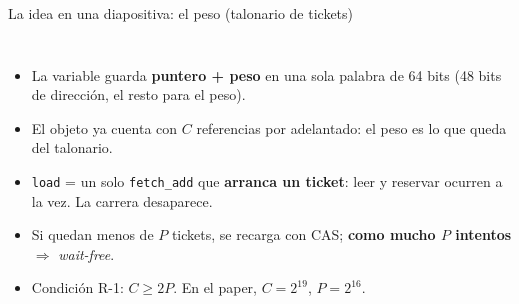 \documentclass[aspectratio=169,11pt]{beamer}
\newcommand{\clave}[1]{\textcolor{acento}{\textbf{#1}}}
\begin{document}
\begin{frame}{La idea en una diapositiva: el peso (talonario de tickets)}
  \begin{columns}[c]
    \begin{itemize}\small
      \item La variable guarda \textbf{puntero + peso} en una sola palabra de 64 bits (48 bits de dirección, el resto para el peso).
      \item El objeto ya cuenta con \clave{$C$} referencias por adelantado: el peso es lo que queda del talonario.
      \item \texttt{load} = un solo \texttt{fetch\_add} que \textbf{arranca un ticket}: leer y reservar ocurren a la vez. La carrera desaparece.
      \item Si quedan menos de $P$ tickets, se recarga con CAS; \clave{como mucho $P$ intentos} $\Rightarrow$ \emph{wait-free}.
      \item Condición R-1: $C \ge 2P$. En el paper, $C = 2^{19}$, $P = 2^{16}$.
    \end{itemize}
    \centering
  \end{columns}
\end{frame}
\end{document}
